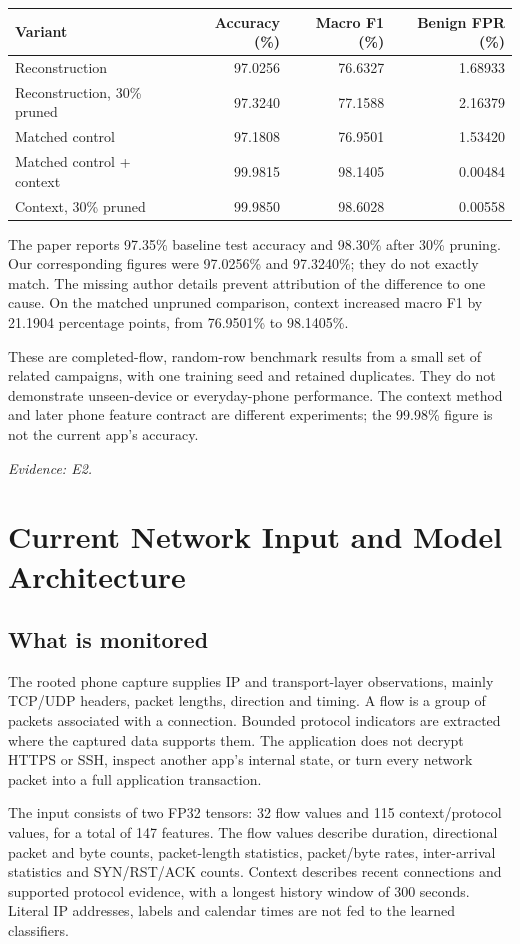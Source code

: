 \documentclass[11pt,a4paper]{article}
\newcommand{\source}[1]{{\small\textit{Evidence: #1.}\par}}
\newcommand{\chapterpage}[1]{\clearpage\section{#1}}
\begin{document}
\begin{center}\small
\begin{tabular}{@{}lrrr@{}}
\toprule Variant & Accuracy (\%) & Macro F1 (\%) & Benign FPR (\%)\\\midrule
Reconstruction & 97.0256 & 76.6327 & 1.68933 \\
Reconstruction, 30\% pruned & 97.3240 & 77.1588 & 2.16379 \\
Matched control & 97.1808 & 76.9501 & 1.53420 \\
Matched control + context & 99.9815 & 98.1405 & 0.00484 \\
Context, 30\% pruned & 99.9850 & 98.6028 & 0.00558 \\
\bottomrule
\end{tabular}
\end{center}

The paper reports 97.35\% baseline test accuracy and 98.30\% after 30\% pruning.
Our corresponding figures were 97.0256\% and 97.3240\%; they do not exactly match.
The missing author details prevent attribution of the difference to one cause.
On the matched unpruned comparison, context increased macro F1 by 21.1904 percentage
points, from 76.9501\% to 98.1405\%.

These are completed-flow, random-row benchmark results from a small set of related
campaigns, with one training seed and retained duplicates. They do not demonstrate
unseen-device or everyday-phone performance. The context method and later phone feature
contract are different experiments; the 99.98\% figure is not the current app's accuracy.
\source{E2}

\chapterpage{Current Network Input and Model Architecture}
\subsection*{What is monitored}
The rooted phone capture supplies IP and transport-layer observations, mainly TCP/UDP
headers, packet lengths, direction and timing. A flow is a group of packets associated
with a connection. Bounded protocol indicators are extracted where the captured data
supports them. The application does not decrypt HTTPS or SSH, inspect another app's
internal state, or turn every network packet into a full application transaction.

The input consists of two FP32 tensors: 32 flow values and 115 context/protocol values,
for a total of 147 features. The flow values describe duration, directional packet and
byte counts, packet-length statistics, packet/byte rates, inter-arrival statistics and
SYN/RST/ACK counts. Context describes recent connections and supported protocol evidence,
with a longest history window of 300 seconds. Literal IP addresses, labels and calendar
times are not fed to the learned classifiers.
\end{document}
